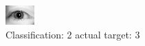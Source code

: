 \begin{figure}[h!]
\begin{center}
\includegraphics[width=0.60\columnwidth]{figures/ID3091_class_2_target_3.png}
\end{center}
\caption{ Classification: 2 actual target: 3}
\label{fig:ID3091_class_2_target_3}
\end{figure}
